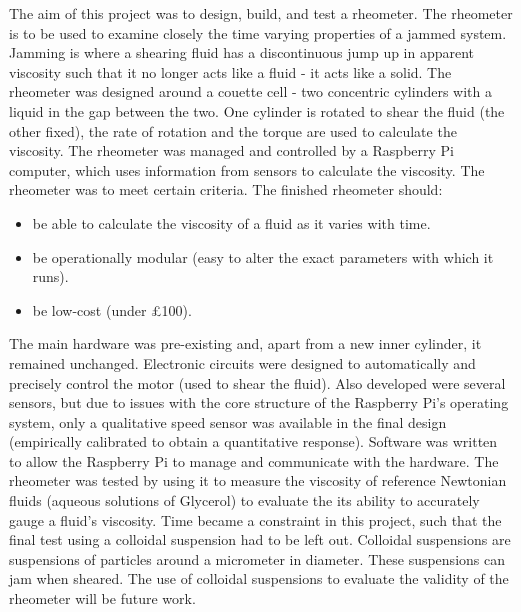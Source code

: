 \documentclass[twoside,a4]{report}
\def\br{\newline \newline \noindent}
\begin{document}
	The aim of this project was to design, build, and test a rheometer. The rheometer is to be used to examine closely the time varying properties of a jammed system. Jamming is where a shearing fluid has a discontinuous jump up in apparent viscosity such that it no longer acts like a fluid - it acts like a solid. The rheometer was designed around a couette cell - two concentric cylinders with a liquid in the gap between the two. One cylinder is rotated to shear the fluid (the other fixed), the rate of rotation and the torque are used to calculate the viscosity. The rheometer was managed and controlled by a Raspberry Pi computer, which uses information from sensors to calculate the viscosity. The rheometer was to meet certain criteria. The finished rheometer should:
	\begin{itemize}
		\item be able to calculate the viscosity of a fluid as it varies with time.
		\item be operationally modular (easy to alter the exact parameters with which it runs).
		\item be low-cost (under \pounds 100).
	\end{itemize}
	The main hardware was pre-existing and, apart from a new inner cylinder, it remained unchanged. Electronic circuits were designed to automatically and precisely control the motor (used to shear the fluid). Also developed were several sensors, but due to issues with the core structure of the Raspberry Pi's operating system, only a qualitative speed sensor was available in the final design (empirically calibrated to obtain a quantitative response). 
	\br
	Software was written to allow the Raspberry Pi to manage and communicate with the hardware. The rheometer was tested by using it to measure the viscosity of reference Newtonian fluids (aqueous solutions of Glycerol) to evaluate the its ability to accurately gauge a fluid's viscosity. 
	\br
	Time became a constraint in this project, such that the final test using a colloidal suspension had to be left out. Colloidal suspensions are suspensions of particles around a micrometer in diameter. These suspensions can jam when sheared. The use of colloidal suspensions to evaluate the validity of the rheometer will be future work.
	
	
	\newpage \begin{center} \large \space \normalsize \end{center}
	
\end{document}
